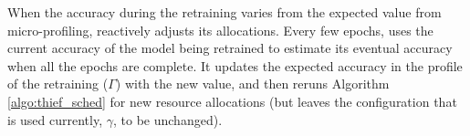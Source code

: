 



When the accuracy during the retraining varies from the expected value from micro-profiling, {\name} reactively adjusts its allocations. 
Every few epochs, \name uses the current accuracy of the model being retrained to estimate its eventual accuracy when all the epochs are complete. It updates the expected accuracy in the profile of the retraining ($\Gamma$) with the new value, and then reruns Algorithm \ref{algo:thief_sched} for new resource allocations (but leaves the configuration that is used currently, $\gamma$, to be unchanged). 






